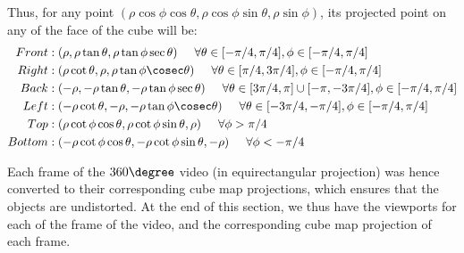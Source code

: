 \par
Thus, for any point \((\rho\cos\phi\cos\theta, \rho\cos\phi\sin\theta, \rho\sin\phi)\), its projected point on any of the face of the cube will be:
\begin{equation}
\begin{split}
Front &:  (\rho, \rho\tan\theta, \rho\tan\phi\sec\theta) \hspace{5mm} \forall \theta \in [-\pi/4, \pi/4], \phi \in [-\pi/4, \pi/4]\\ 
Right &: (\rho\cot\theta, \rho, \rho\tan\phi\cosec\theta) \hspace{5mm} \forall \theta \in [\pi/4, 3\pi/4], \phi \in [-\pi/4, \pi/4] \\
Back &: (-\rho, -\rho\tan\theta, -\rho\tan\phi\sec\theta) \hspace{5mm} \forall \theta \in [3\pi/4, \pi] \cup [-\pi, -3\pi/4], \phi \in [-\pi/4, \pi/4] \\
Left &: (-\rho\cot\theta, -\rho, -\rho\tan\phi\cosec\theta) \hspace{5mm} \forall \theta \in [-3\pi/4, -\pi/4], \phi \in [-\pi/4, \pi/4] \\
Top &: (\rho\cot\phi\cos\theta, \rho\cot\phi\sin\theta, \rho) \hspace{5mm} \forall \phi>\pi/4 \\
Bottom &: (-\rho\cot\phi\cos\theta, -\rho\cot\phi\sin\theta, -\rho) \hspace{5mm} \forall \phi<-\pi/4 
\end{split}
\label{eq:cubemap}
\end{equation}

\par
Each frame of the $360\degree$ video (in equirectangular projection) was hence converted to their corresponding cube map projections, which ensures that the objects are undistorted. At the end of this section, we thus have the viewports for each of the frame of the video, and the corresponding cube map projection of each frame.

